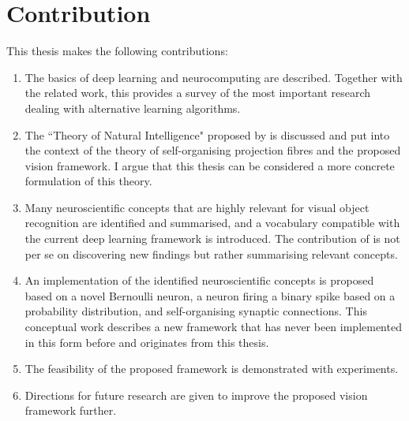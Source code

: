 \section{Contribution}
This thesis makes the following contributions:
\begin{enumerate}
	\item The basics of deep learning and neurocomputing are described. Together with the related work, this provides a survey of the most important research dealing with alternative learning algorithms.
	\item The ``Theory of Natural Intelligence" proposed by  is discussed and put into the context of the theory of self-organising projection fibres  and the proposed vision framework. I argue that this thesis can be considered a more concrete formulation of this theory.
    \item Many neuroscientific concepts that are highly relevant for visual object recognition are identified and summarised, and a vocabulary compatible with the current deep learning framework is introduced. The contribution of  is not per se on discovering new findings but rather summarising relevant concepts.
	\item An implementation of the identified neuroscientific concepts is proposed based on a novel Bernoulli neuron,  a neuron firing a binary spike based on a probability distribution, and self-organising synaptic connections. This conceptual work describes a new framework that has never been implemented in this form before and originates from this thesis. 
    \item The feasibility of the proposed framework is demonstrated with experiments.
    \item Directions for future research are given to improve the proposed vision framework further.
\end{enumerate}


